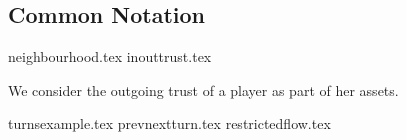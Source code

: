 \subsection{Common Notation}
{neighbourhood.tex}
{inouttrust.tex}

We consider the outgoing trust of a player as part of her assets.

{turnsexample.tex}
{prevnextturn.tex}
{restrictedflow.tex}
